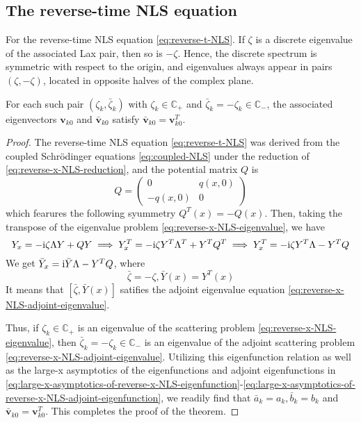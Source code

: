 \subsection{The reverse-time NLS equation}
\begin{theorem}\label{thm:NLS-inverse-t}
    For the reverse-time NLS equation \eqref{eq:reverse-t-NLS}. If $\zeta$ is a discrete eigenvalue of the associated Lax pair, then so is $-\zeta$. Hence, the discrete spectrum is symmetric with respect to the origin, and eigenvalues always appear in pairs $(\zeta, -\zeta)$, located in opposite halves of the complex plane.

    For each such pair $(\zeta_k, \bar{\zeta}_k)$ with $\zeta_k \in \mathbb{C}_+$ and $\bar{\zeta}_k = -\zeta_k \in \mathbb{C}_-$, the associated eigenvectors $\mathbf{v}_{k0}$ and $\bar{\mathbf{v}}_{k0}$ satisfy $ \bar{\mathbf{v}}_{k0} = \mathbf{v}_{k0}^{T} $.
\end{theorem}
\begin{proof}
    The reverse-time NLS equation \eqref{eq:reverse-t-NLS} was derived from the coupled Schrödinger equations \eqref{eq:coupled-NLS} under the reduction of \eqref{eq:reverse-x-NLS-reduction}, and the potential matrix $ Q $ is
    \begin{equation}
        Q = \begin{pmatrix}
            0 & q(x,0) \\
            -q(x,0) & 0
        \end{pmatrix}
    \end{equation}
    which fearures the following syummetry $ Q^{T}(x) = -Q(x) $. Then, taking the transpose of the eigenvalue problem \eqref{eq:reverse-x-NLS-eigenvalue}, we have
    \begin{equation}
            Y_{x} = - \mathrm{i} \zeta \Lambda Y + QY \implies Y_{x}^{T} = -\mathrm{i} \zeta Y^{T} \Lambda^{T} + Y^{T} Q^{T} \implies Y_{x}^{T} = -\mathrm{i} \zeta Y^{T} \Lambda - Y^{T}Q
    \end{equation}
    We get $ \bar{Y}_{x} = \mathrm{i} \bar{Y} \Lambda - Y^{T}Q $, where
    \begin{equation}
        \bar{\zeta} = -\zeta, \bar{Y}(x) = Y^{T}(x)
    \end{equation} 
    It means that $ [\bar{\zeta}, \bar{Y}(x)] $ satifies the adjoint eigenvalue equation \eqref{eq:reverse-x-NLS-adjoint-eigenvalue}. 

    Thus, if $ \zeta_{k} \in \mathbb{C}_{+} $ is an eigenvalue of the scattering problem \eqref{eq:reverse-x-NLS-eigenvalue}, then $ \bar{\zeta}_{k} = -\zeta_{k} \in \mathbb{C}_{-} $ is an eigenvalue of the adjoint scattering problem \eqref{eq:reverse-x-NLS-adjoint-eigenvalue}. Utilizing this eigenfunction relation as well as the large-x asymptotics of the eigenfunctions and adjoint eigenfunctions in \eqref{eq:large-x-asymptotics-of-reverse-x-NLS-eigenfunction}-\eqref{eq:large-x-asymptotics-of-reverse-x-NLS-adjoint-eigenfunction}, we readily find that $ \bar{a}_{k} = a_{k}, \bar{b}_{k} = b_{k} $ and $ \bar{\mathbf{v}}_{k0} = \mathbf{v}_{k0}^{T} $. This completes the proof of the theorem.
   \end{proof}
